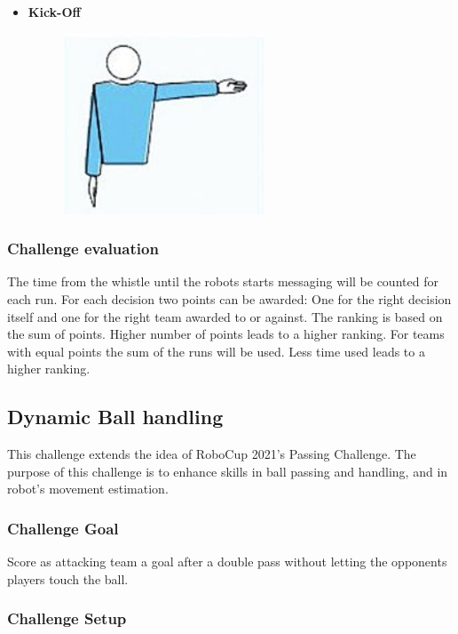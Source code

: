         \begin{itemize}
            \item \textbf{Kick-Off} 
            \begin{figure}
                \includegraphics{figs/kick-off_referee.jpg}
            \end{figure}
        \end{itemize}

    \subsubsection{Challenge evaluation}
        The time from the whistle until the robots starts messaging will be counted for each run.
        For each decision two points can be awarded: One for the right decision itself and one for the right team awarded to or against.
        The ranking is based on the sum of points. Higher number of points leads to a higher ranking. For teams with equal points the sum of the runs will be used. Less time used leads to a higher ranking.
        

\subsection{Dynamic Ball handling}

    This challenge extends the idea of RoboCup 2021's Passing Challenge. The purpose of this challenge is to enhance skills in ball passing and handling, and in robot's movement estimation.

    \subsubsection{Challenge Goal}

    Score as attacking team a goal after a double pass without letting the opponents players touch the ball.

    \subsubsection{Challenge Setup}

